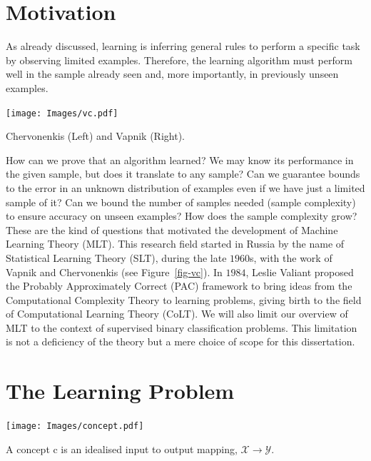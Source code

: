 \documentclass[
  letterpaper,
  12pt,
  british]{tufte-book}
\theoremstyle{plain}
\theoremstyle{definition}
\theoremstyle{plain}
\theoremstyle{remark}
\begin{document}
\hypertarget{motivation}{%
\section{Motivation}\label{motivation}}

As already discussed, learning is inferring general rules to perform a
specific task by observing limited examples. Therefore, the learning
algorithm must perform well in the sample already seen and, more
importantly, in previously unseen examples.

\begin{marginfigure}

{\centering \texttt{[image: Images/vc.pdf]}

}

\caption{\label{fig-vc}Chervonenkis (Left) and Vapnik (Right).}

\end{marginfigure}

How can we prove that an algorithm learned? We may know its performance
in the given sample, but does it translate to any sample? Can we
guarantee bounds to the error in an unknown distribution of examples
even if we have just a limited sample of it? Can we bound the number of
samples needed (sample complexity) to ensure accuracy on unseen
examples? How does the sample complexity grow? These are the kind of
questions that motivated the development of Machine Learning Theory
(MLT). This research field started in Russia by the name of Statistical
Learning Theory (SLT), during the late \(1960\)s, with the work of
Vapnik and Chervonenkis (see Figure~\ref{fig-vc}). In \(1984\), Leslie
Valiant proposed the Probably Approximately Correct (PAC) framework to
bring ideas from the Computational Complexity Theory to learning
problems, giving birth to the field of Computational Learning Theory
(CoLT). We will also limit our overview of MLT to the context of
supervised binary classification problems. This limitation is not a
deficiency of the theory but a mere choice of scope for this
dissertation.

\hypertarget{the-learning-problem}{%
\section{The Learning Problem}\label{the-learning-problem}}

\begin{marginfigure}

{\centering \texttt{[image: Images/concept.pdf]}

}

\caption{\label{fig-concept}A concept c is an idealised input to output
mapping, \(\mathcal{X}\to \mathcal{Y}\).}

\end{marginfigure}
\end{document}
